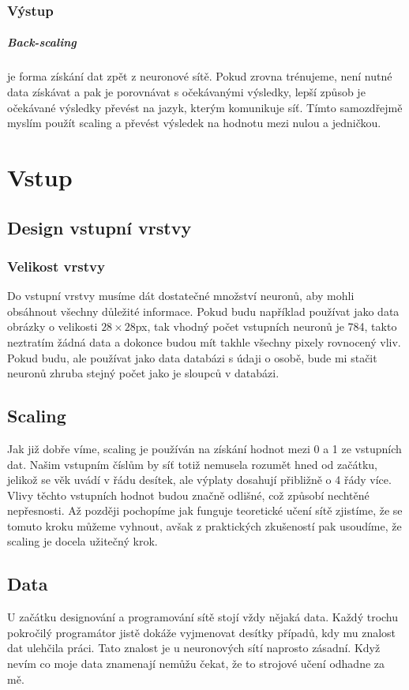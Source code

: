 \documentclass[12pt,a4paper]{report}
\begin{document}
	\subsection{Výstup}
		\paragraph{Back-scaling}
		je forma získání dat zpět z neuronové sítě. Pokud zrovna trénujeme, není nutné data získávat a pak je porovnávat s očekávanými výsledky, lepší způsob je očekávané výsledky převést na jazyk, kterým komunikuje síť. Tímto samozdřejmě myslím použít scaling a převést výsledek na hodnotu mezi nulou a jedničkou.
	
\chapter{Vstup}
	\section{Design vstupní vrstvy}
		\subsection{Velikost vrstvy}
		Do vstupní vrstvy musíme dát dostatečné množství neuronů, aby mohli obsáhnout všechny důležité informace. Pokud budu například používat jako data obrázky o velikosti $28\times 28$px, tak vhodný počet vstupních neuronů je 784, takto neztratím žádná data a dokonce budou mít takhle všechny pixely rovnocený vliv. Pokud budu, ale používat jako data databázi s údaji o osobě, bude mi stačit neuronů zhruba stejný počet jako je sloupců v databázi.
	\section{Scaling}
	Jak již dobře víme, scaling je používán na získání hodnot mezi 0 a 1 ze vstupních dat. Našim vstupním číslům by síť totiž nemusela rozumět hned od začátku, jelikož se věk uvádí v řádu desítek, ale výplaty dosahují přibližně o 4 řády více. Vlivy těchto vstupních hodnot budou značně odlišné, což způsobí nechtěné nepřesnosti. Až později pochopíme jak funguje teoretické učení sítě zjistíme, že se tomuto kroku můžeme vyhnout, avšak z praktických zkušeností pak usoudíme, že scaling je docela užitečný krok.
	\section{Data}
	U začátku designování a programování sítě stojí vždy nějaká data. Každý trochu pokročilý programátor jistě dokáže vyjmenovat desítky případů, kdy mu znalost dat ulehčila práci. Tato znalost je u neuronových sítí naprosto zásadní. Když nevím co moje data znamenají nemůžu čekat, že to strojové učení odhadne za mě.
	
\end{document}
